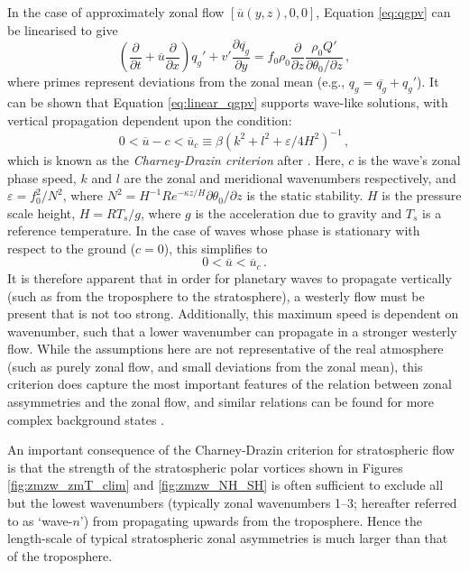 In the case of approximately zonal flow $[\overline{u}(y,z),0,0]$, Equation
\ref{eq:qgpv} can be linearised to give
\begin{equation}
\left(\frac{\partial}{\partial t} + \overline{u}\frac{\partial}{\partial
    x}\right)q_g' + v'\frac{\partial\overline{q_g}}{\partial y} = f_0\rho_0 \frac{\partial}{\partial z}
\frac{\rho_0Q'}{\partial\theta_{0}/\partial z} \, ,
\label{eq:linear_qgpv} 
\end{equation}
where primes represent deviations from the zonal mean (e.g., $q_g =
\overline{q_g} + q_g'$). It can be shown that Equation \ref{eq:linear_qgpv}
supports wave-like solutions, with vertical propagation dependent upon the
condition:
\begin{equation}
0 < \overline{u}-c < \overline{u}_c \equiv \beta(k^2+l^2+\varepsilon/4H^2)^{-1} \,,
\end{equation}
which is known as the \emph{Charney-Drazin criterion} after
\citet{Charney1961}. Here, $c$ is the wave's zonal phase speed, $k$ and $l$ are
the zonal and meridional wavenumbers respectively, and
$\varepsilon = f_0^2/N^2$, where
$N^2 = H^{-1}Re^{-\kappa z/H}\partial\theta_0/\partial z$ is the static
stability. $H$ is the pressure scale height, $H=RT_s/g$, where $g$ is the
acceleration due to gravity and $T_s$ is a reference temperature. In the case of
waves whose phase is stationary with respect to the ground ($c=0$), this
simplifies to
\begin{equation}
0 < \overline{u} < \overline{u}_c\, . 
\label{eq:charney-drazin}
\end{equation}
It is therefore apparent that in order for planetary waves to propagate
vertically (such as from the troposphere to the stratosphere), a westerly flow
must be present that is not too strong. Additionally, this maximum speed is
dependent on wavenumber, such that a lower wavenumber can propagate in a
stronger westerly flow. While the assumptions here are not representative of the
real atmosphere (such as purely zonal flow, and small deviations from the zonal
mean), this criterion does capture the most important features of the relation
between zonal assymmetries and the zonal flow, and similar relations can be
found for more complex background states \citep{Andrews1987}.

An important consequence of the Charney-Drazin criterion for stratospheric flow
is that the strength of the stratospheric polar vortices shown in Figures
\ref{fig:zmzw_zmT_clim} and \ref{fig:zmzw_NH_SH} is often sufficient to exclude
all but the lowest wavenumbers (typically zonal wavenumbers 1--3; hereafter
referred to as `wave-$n$') from propagating upwards from the troposphere. Hence
the length-scale of typical stratospheric zonal asymmetries is much larger than
that of the troposphere.

